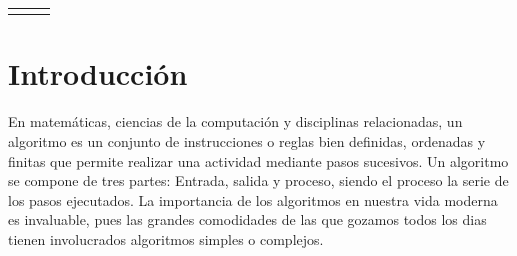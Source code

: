 \documentclass{report}
\begin{document}
\begin{center}
\begin{tabular}{l c r}
    & \bf\fontsize{22}{0}{\selectfont{ Escuela Superior de C\'omputo}} &  \\
    \end{tabular}

	
	\vspace*{2\baselineskip}
	
	{
		\bf\fontsize{12}{0}{\selectfont{An\'alisis de Algoritmos, Sem: 2021-1, 3CV1, Pr\'actica 1, 19/10/20}}
	}
			
	\vspace*{2\baselineskip}
			 
	{
		\fontsize{23}{0}{\selectfont{Práctica 1: Determinación Experimental de la Complejidad Temporal de un Algoritmo}}
	}
	
	\vspace*{2\baselineskip}
	
	{
		\bf\fontsize{12}{0}{\selectfont{Valle Mart\'inez Luis Eduardo, Rivero Ronquillo Omar Imanol}}
	}
	
	\vspace*{1\baselineskip}
	
	{
	}
	
	\vspace*{2\baselineskip}

    {
	    \fontsize{12}{0}
	    
	    \fontsize{12}{0}
	
	}
\end{center}

\section*{Introducción} 
    En matem\'aticas, ciencias de la computaci\'on y disciplinas relacionadas, un algoritmo es un conjunto de instrucciones o reglas bien definidas, ordenadas y finitas que permite realizar una actividad mediante pasos sucesivos. Un algoritmo se compone de tres partes: Entrada, salida y proceso, siendo el proceso la serie de los pasos ejecutados. La importancia de los algoritmos en nuestra vida moderna es invaluable, pues las grandes comodidades de las que gozamos todos los dias tienen involucrados algoritmos simples o complejos.\par
    
\end{document}
